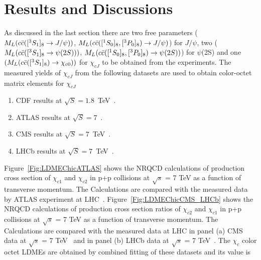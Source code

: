 \documentclass[aps,prc,preprint,superscriptaddress,showpacs,showkeys,amsmath]{revtex4-1}
\begin{document}
\section{Results and Discussions}
As discussed in the last section there are two free parameters ($M_{L}(c{\bar{c}}([^3S_1]_{8}\rightarrow J/\psi))$,
 $M_{L}(c{\bar{c}}([^1S_0]_{8},[^3P_0]_{8})\rightarrow J/\psi)$) for $J/\psi$, 
two ($M_{L}(c{\bar{c}}([^3S_1]_{8}\rightarrow \psi(2S)))$, $M_{L}(c{\bar{c}}([^1S_0]_{8},[^3P_0]_{8})\rightarrow \psi(2S))$)  
for $\psi$(2S) and one $(M_{L}(c{\bar{c}}([^3S_1]_{8})\rightarrow \chi_{c0}))$ for $\chi_{cJ}$ to be obtained 
from the experiments. 
The measured yields of $\chi_{cJ}$ from the following datasets
are used to obtain color-octet matrix elements for $\chi_{cJ}$ 
\begin{enumerate}
\item{CDF results at $\sqrt{S}=1.8$~TeV~\cite{Abe:1997yz}}.
\item{ATLAS results at $\sqrt{S}=7$~\cite{ATLAS:2014ala}}.
\item{CMS results at $\sqrt{S}=7$~TeV~\cite{Chatrchyan:2012ub}}.
\item{LHCb results at $\sqrt{S}=7$~TeV~\cite{Aaij:2013dja}}.
\end{enumerate}
Figure~\ref{Fig:LDMEChicATLAS} shows the NRQCD calculations of production cross section 
of  $\chi_{c1}$ and $\chi_{c2}$ in p+p collisions at $\sqrt{s}$ = 7 TeV as a function of 
transverse momentum. The Calculations are compared with the measured data by
ATLAS experiment at LHC~\cite{ATLAS:2014ala}. Figure~\ref{Fig:LDMEChicCMS_LHCb} shows
the NRQCD calculations of production cross section ratios 
of $\chi_{c2}$ and $\chi_{c1}$ in p+p collisions at
$\sqrt{s}$ = 7 TeV as a function of transverse momentum. 
The Calculations are compared with the measured data at
LHC in panel (a) CMS data at $\sqrt{s}$ = 7 TeV~\cite{Chatrchyan:2012ub}
and in panel (b) LHCb data at $\sqrt{s}$ = 7 TeV~\cite{Aaij:2013dja}.  
The $\chi_{c}$ color octet LDMEs are obtained by combined fitting of these datasets
and its value is 
\end{document}
